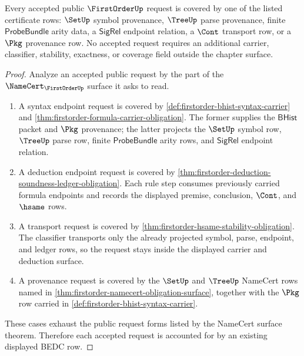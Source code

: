 \begin{theorem}\label{thm:firstorder-coverage-obligation}
Every accepted public $\FirstOrderUp$ request is covered by one of the listed
certificate rows: $\SetUp$ symbol provenance, $\TreeUp$ parse provenance,
finite $\mathsf{ProbeBundle}$ arity data, a $\mathsf{SigRel}$ endpoint relation,
a $\Cont$ transport row, or a $\Pkg$ provenance row. No accepted request
requires an additional carrier, classifier, stability, exactness, or coverage
field outside the chapter surface.
\end{theorem}
\begin{proof}
Analyze an accepted public request by the part of the $\NameCert_{\FirstOrderUp}$
surface it asks to read.

\begin{enumerate}
\item A syntax endpoint request is covered by
\autoref{def:firstorder-bhist-syntax-carrier} and
\autoref{thm:firstorder-formula-carrier-obligation}. The former supplies the
$\mathsf{BHist}$ packet and $\Pkg$ provenance; the latter projects the
$\SetUp$ symbol row, $\TreeUp$ parse row, finite $\mathsf{ProbeBundle}$ arity
rows, and $\mathsf{SigRel}$ endpoint relation.

\item A deduction endpoint request is covered by
\autoref{thm:firstorder-deduction-soundness-ledger-obligation}. Each rule
step consumes previously carried formula endpoints and records the displayed
premise, conclusion, $\Cont$, and $\hsame$ rows.

\item A transport request is covered by
\autoref{thm:firstorder-hsame-stability-obligation}. The classifier transports
only the already projected symbol, parse, endpoint, and ledger rows, so the
request stays inside the displayed carrier and deduction surface.

\item A provenance request is covered by the $\SetUp$ and $\TreeUp$ NameCert
rows named in \autoref{thm:firstorder-namecert-obligation-surface}, together
with the $\Pkg$ row carried in
\autoref{def:firstorder-bhist-syntax-carrier}.
\end{enumerate}

These cases exhaust the public request forms listed by the NameCert surface
theorem. Therefore each accepted request is accounted for by an existing
displayed BEDC row.
\end{proof}

